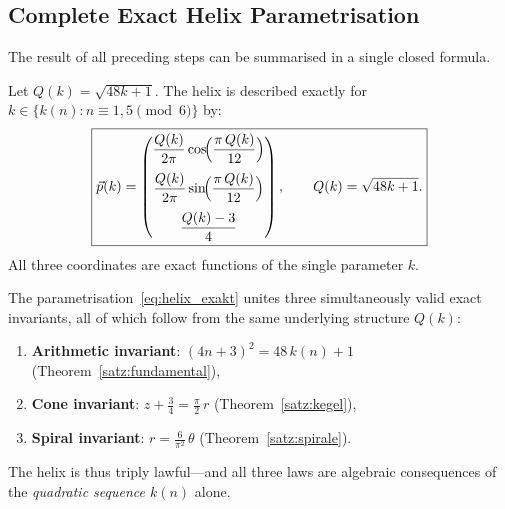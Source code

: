 \subsection{Complete Exact Helix Parametrisation}
\label{subsec:helix_parametrisierung}

The result of all preceding steps can be summarised in a single
closed formula.

\begin{satz}\label{satz:helix}
Let $Q(k) = \sqrt{48k+1}$. The helix is described exactly for
$k \in \{k(n) : n \equiv 1,5 \pmod{6}\}$ by:
\begin{equation}\label{eq:helix_exakt}
  \boxed{
  \vec{p}(k)
  = \begin{pmatrix}
      \dfrac{Q(k)}{2\pi}\cos\!\Bigl(\dfrac{\pi\,Q(k)}{12}\Bigr)\\[10pt]
      \dfrac{Q(k)}{2\pi}\sin\!\Bigl(\dfrac{\pi\,Q(k)}{12}\Bigr)\\[10pt]
      \dfrac{Q(k)-3}{4}
    \end{pmatrix},
  \qquad Q(k) = \sqrt{48k+1}.
  }
\end{equation}
All three coordinates are exact functions of the single parameter $k$.
\end{satz}

\begin{bemerkung}
The parametrisation~\eqref{eq:helix_exakt} unites three simultaneously
valid exact invariants, all of which follow from the same underlying
structure $Q(k)$:
\begin{enumerate}
  \item \textbf{Arithmetic invariant}:
        $(4n+3)^2 = 48\,k(n)+1$ \quad (Theorem~\ref{satz:fundamental}),
  \item \textbf{Cone invariant}:
        $z + \tfrac{3}{4} = \tfrac{\pi}{2}\,r$ \quad (Theorem~\ref{satz:kegel}),
  \item \textbf{Spiral invariant}:
        $r = \tfrac{6}{\pi^2}\,\theta$ \quad (Theorem~\ref{satz:spirale}).
\end{enumerate}
The helix is thus triply lawful---and all three laws are algebraic
consequences of the \emph{quadratic sequence $k(n)$} alone.
\end{bemerkung}

